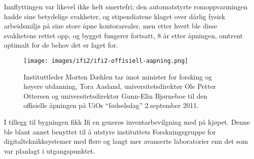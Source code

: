 Innflyttingen var likevel ikke helt smertefri; den automatstyrte romoppvarmingen hadde sine betydelige svakheter, og stipendiatene klaget over dårlig fysisk arbeidsmiljø på sine store åpne kontorarealer, men etter hvert ble disse svakhetene rettet opp, og bygget fungerer fortsatt, 8 år etter åpningen, omtrent optimalt for de behov det er laget for.

\begin{figure}
	\texttt{[image: images/ifi2/ifi2-offisiell-aapning.png]}
	\caption{Instituttleder Morten Dæhlen tar imot minister for forsking og høyere utdanning, Tora Aasland, universitetsdirektør Ole Petter Ottersen og universitetsdirektør Gunn-Elin Bjørneboe til den offisielle åpningen på UiOs ``fødselsdag'' 2.september 2011.}
\end{figure}

I tillegg til bygningen fikk Ifi en generøs inventarbevilgning med på kjøpet. Denne ble blant annet benyttet til å utstyre instituttets Forskningsgruppe for digitalteknikksystemer med flere og langt mer avanserte laboratorier enn det som var planlagt i utgangspunktet.
